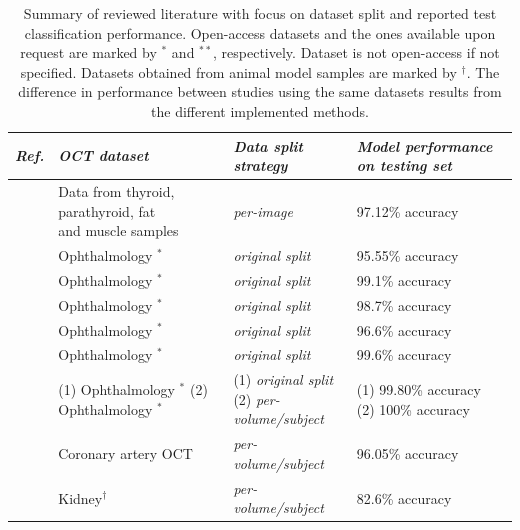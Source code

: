 \documentclass[fleqn,10pt]{wlscirep}
\begin{document}
\begin{table}[ht]
\centering
\caption{\label{tab:discussion_1} Summary of reviewed literature with focus on dataset split and reported test classification performance. Open-access datasets and the ones available upon request are marked by $^\ast$ and $^{\ast\ast}$, respectively. Dataset is not open-access if not specified. Datasets obtained from animal model samples are marked by $^\dagger$. The difference in performance between studies using the same datasets results from the different implemented methods.}
\renewcommand{\arraystretch}{1.5}
\begin{tabular}{|c|l|l|l|}
\hline
\textit{Ref.} & \textit{OCT dataset} & \textit{Data split strategy} & \textit{Model performance on testing set} \\
\hline\hline
\cite{wang2019deep} & \makecell[l]{Data from thyroid, parathyroid, fat \\ and muscle samples} & \textit{per-image} &  97.12\% accuracy \\
\hline
\cite{najeeb2018classification} & Ophthalmology \cite{kermany2018large}$^\ast$ & \textit{original split} & 95.55\% accuracy \\
\hline
\cite{chen2021classification} & Ophthalmology \cite{kermany2018large}$^\ast$ & \textit{original split} & 99.1\% accuracy \\
\hline
\cite{latha2021automated} & Ophthalmology \cite{kermany2018large}$^\ast$ & \textit{original split} & 98.7\% accuracy \\
\hline
\cite{latha2021automated} & Ophthalmology \cite{kermany2018large}$^\ast$ & \textit{original split} & 96.6\% accuracy \\
\hline
\cite{tsuji2020classification} & Ophthalmology \cite{kermany2018large}$^\ast$ & \textit{original split} & 99.6\% accuracy \\
\hline
\cite{kamran2019optic} & \makecell[l]{(1) Ophthalmology \cite{kermany2018large}$^\ast$ \\(2) Ophthalmology \cite{srinivasan2014fully}$^\ast$} & \makecell[l]{(1) \textit{original split}\\(2) \textit{per-volume/subject}} & \makecell[l]{(1) 99.80\% accuracy\\(2) 100\% accuracy} \\
\hline
\cite{athanasiou2019deep} & Coronary artery OCT & \textit{per-volume/subject} & 96.05\% accuracy \\
\hline
\cite{wang2021deep} & Kidney$^\dagger$ & \textit{per-volume/subject} & 82.6\% accuracy \\

\end{tabular}
\end{table}
\end{document}
